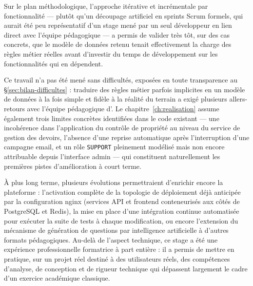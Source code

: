 \documentclass[12pt,a4paper,oneside]{report}
\begin{document}
Sur le plan méthodologique, l'approche itérative et incrémentale par
fonctionnalité --- plutôt qu'un découpage artificiel en sprints Scrum
formels, qui aurait été peu représentatif d'un stage mené par un seul
développeur en lien direct avec l'équipe pédagogique --- a permis de
valider très tôt, sur des cas concrets, que le modèle de données retenu
tenait effectivement la charge des règles métier réelles avant d'investir
du temps de développement sur les fonctionnalités qui en dépendent.

Ce travail n'a pas été mené sans difficultés, exposées en toute
transparence au \S\ref{sec:bilan-difficultes} : traduire des règles métier
parfois implicites en un modèle de données à la fois simple et fidèle à la
réalité du terrain a exigé plusieurs allers-retours avec l'équipe
pédagogique d'\Entreprise. Le chapitre~\ref{ch:realisation} assume
également trois limites concrètes identifiées dans le code existant --- une
incohérence dans l'application du contrôle de propriété au niveau du
service de gestion des devoirs, l'absence d'une reprise automatique
après l'interruption d'une campagne email, et un rôle \texttt{SUPPORT}
pleinement modélisé mais non encore attribuable depuis l'interface
admin --- qui constituent naturellement les premières pistes
d'amélioration à court terme.

À plus long terme, plusieurs évolutions permettraient d'enrichir encore la
plateforme : l'activation complète de la topologie de déploiement déjà
anticipée par la configuration nginx (services API et frontend
conteneurisés aux côtés de PostgreSQL et Redis), la mise en place d'une
intégration continue automatisée pour exécuter la suite de tests à chaque
modification, ou encore l'extension du mécanisme de génération de
questions par intelligence artificielle à d'autres formats pédagogiques.
Au-delà de l'aspect technique, ce stage a été une expérience professionnelle
formatrice à part entière : il a permis de mettre en pratique, sur un projet
réel destiné à des utilisateurs réels, des compétences d'analyse, de
conception et de rigueur technique qui dépassent largement le cadre d'un
exercice académique classique.

\clearpage
\printbibliography[title={Bibliographie et webographie}]

\appendix
\end{document}
